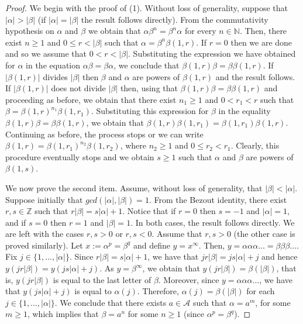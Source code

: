 \documentclass[a4paper,12pt]{amsart}
\theoremstyle{definition}
\theoremstyle{remark}
\numberwithin{equation}{section}
\newcommand{\alf}{\mathscr{A}}
\newcommand{\N}{\mathbb{N}}
\newcommand{\Z}{\mathbb{Z}}
\begin{document}
\begin{proof} 
We begin with the proof of (1). Without loss of generality, suppose that $|\alpha|>|\beta|$ (if $|\alpha|=|\beta|$ the result follows directly). From the commutativity hypothesis on $\alpha$ and $\beta$ we obtain that $\alpha \beta^n = \beta^n \alpha$ for every $n\in \N$. Then, there exist $n \geq 1$ and $0\leq r < |\beta|$ such that $\alpha = \beta^n \beta(1,r)$. If $r=0$ then we are done and so we assume that $0< r < |\beta|$. Substituting the expression we have obtained for $\alpha$ in the equation $\alpha \beta = \beta \alpha$, we conclude that $\beta(1,r)\beta = \beta \beta(1,r)$. If $|\beta(1,r)|$ divides $|\beta|$ then $\beta$ and $\alpha$ are powers of $\beta(1,r)$ and the result follows.  If $|\beta(1,r)|$ does not divide $|\beta|$ then, using that $\beta(1,r)\beta = \beta \beta(1,r)$ and proceeding as before, we obtain that there exist $n_1\geq 1$ and $0<r_1<r$ such that  $\beta = \beta(1,r)^{n_1}\beta(1,r_1)$. Substituting this expression for $\beta$ in the equality $\beta(1,r)\beta = \beta \beta(1,r)$, we obtain that $\beta(1,r)\beta(1,r_1)=\beta(1,r_1)\beta(1,r)$. Continuing as before, the process stops or we can write $\beta(1,r)= \beta(1,r_1)^{n_2} \beta(1,r_2)$, where $n_2\geq 1$ and $0\leq r_2 <r_1$. Clearly, this procedure eventually stops and we obtain $s\geq 1$ such that $\alpha$ and $\beta$ are powers of $\beta(1,s)$.

We now prove the second item. Assume, without loss of generality, that $|\beta|<|\alpha|$.
Suppose initially that $gcd(|\alpha|, |\beta|)=1$. From the Bezout identity, there exist $r,s\in \Z$ such that $r|\beta|=s|\alpha|+1$. Notice that if $r=0$ then $s=-1$ and $|\alpha|=1$, and if $s=0$ then  $r=1$ and $|\beta|=1$. In both cases, the result follows directly. We are left with the cases $r,s>0$ or $r,s<0$. Assume that $r,s>0$ (the other case is proved similarly). Let $x:=\alpha^p=\beta^q$ and define $y=x^\infty$. Then,  $y=\alpha\alpha\alpha\ldots = \beta\beta\beta\ldots$. Fix $j\in \{1,...,|\alpha|\}$.  Since $r|\beta|=s|\alpha|+1$, we have that $j r|\beta|=js|\alpha|+j$ and hence $y(jr|\beta|)=y(js|\alpha|+j)$. As $y=\beta^\infty$, we obtain that $y(jr|\beta|)=\beta(|\beta|)$, that is, $y(jr|\beta|)$ is equal to the last letter of $\beta$. Moreover, since $y=\alpha\alpha\alpha...$, we have that $y(js|\alpha|+j)$ is equal to $\alpha(j)$. Therefore, $\alpha(j)=\beta(|\beta|)$ for each $j\in \{1,...,|\alpha|\}$. We conclude that there exists $a\in\alf$ such that $\alpha=a^{m}$, for some $m\geq 1$, which implies that $\beta=a^n$ for some $n\geq 1$ (since $\alpha^p=\beta^q$). 


\end{proof}
\end{document}
